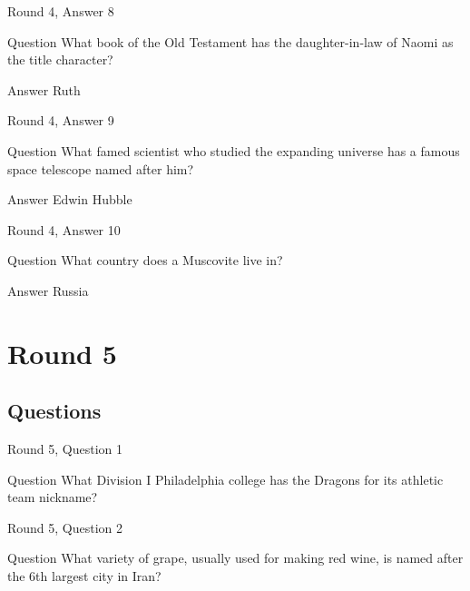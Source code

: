 \documentclass[11pt]{beamer}
\begin{document}
\begin{frame}{Round 4, Answer 8}
\begin{block}{Question}
What book of the Old Testament has the daughter-in-law of Naomi as the title character\@?
\end{block}
\pause{}
\begin{block}{Answer}
Ruth
\end{block}
\end{frame}
    

\begin{frame}{Round 4, Answer 9}
\begin{block}{Question}
What famed scientist who studied the expanding universe has a famous space telescope named after him\@?
\end{block}
\pause{}
\begin{block}{Answer}
Edwin Hubble
\end{block}
\end{frame}
    

\begin{frame}{Round 4, Answer 10}
\begin{block}{Question}
What country does a Muscovite live in\@?
\end{block}
\pause{}
\begin{block}{Answer}
Russia
\end{block}
\end{frame}
    

\section{Round 5}
    
\subsection{Questions}

\begin{frame}{Round 5, Question 1}
\begin{block}{Question}
What Division I Philadelphia college has the Dragons for its athletic team nickname\@?
\end{block}
\end{frame}
    

\begin{frame}{Round 5, Question 2}
\begin{block}{Question}
What variety of grape, usually used for making red wine, is named after the 6th largest city in Iran\@?
\end{block}
\end{frame}
    
\end{document}
